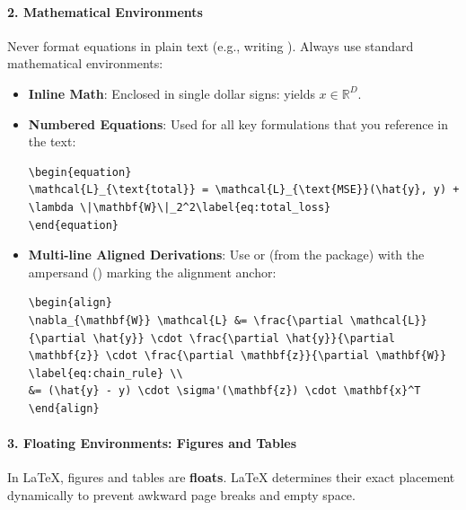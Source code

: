 \paragraph{2. Mathematical Environments}
Never format equations in plain text (e.g., writing ). Always use standard mathematical environments:
\begin{itemize}
    \item \textbf{Inline Math}: Enclosed in single dollar signs:  yields $x \in \mathbb{R}^D$.
    \item \textbf{Numbered Equations}: Used for all key formulations that you reference in the text:
\begin{lstlisting}[style=pythonstyle]
\begin{equation}
\mathcal{L}_{\text{total}} = \mathcal{L}_{\text{MSE}}(\hat{y}, y) + \lambda \|\mathbf{W}\|_2^2\label{eq:total_loss}
\end{equation}
\end{lstlisting}
    \item \textbf{Multi-line Aligned Derivations}: Use  or  (from the  package) with the ampersand (\code{\&}) marking the alignment anchor:
\begin{lstlisting}[style=pythonstyle]
\begin{align}
\nabla_{\mathbf{W}} \mathcal{L} &= \frac{\partial \mathcal{L}}{\partial \hat{y}} \cdot \frac{\partial \hat{y}}{\partial \mathbf{z}} \cdot \frac{\partial \mathbf{z}}{\partial \mathbf{W}} \label{eq:chain_rule} \\
&= (\hat{y} - y) \cdot \sigma'(\mathbf{z}) \cdot \mathbf{x}^T
\end{align}
\end{lstlisting}
\end{itemize}

\paragraph{3. Floating Environments: Figures and Tables}
In \LaTeX{}, figures and tables are \textbf{floats}. \LaTeX{} determines their exact placement dynamically to prevent awkward page breaks and empty space.

